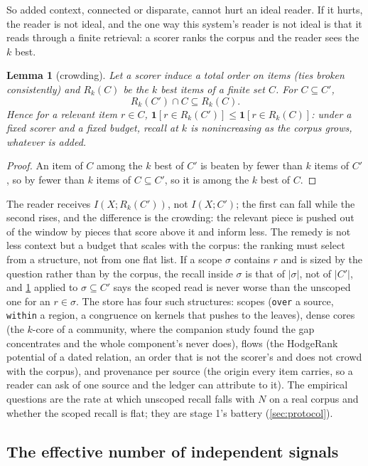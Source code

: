 \documentclass[11pt]{article}
\theoremstyle{plain}
\newtheorem{lemma}[theorem]{Lemma}
\theoremstyle{definition}
\theoremstyle{remark}
\newcommand{\code}[1]{\texttt{#1}}
\begin{document}
So added context, connected or disparate, cannot hurt an ideal reader. If it hurts, the reader is
not ideal, and the one way this system's reader is not ideal is that it reads through a finite
retrieval: a scorer ranks the corpus and the reader sees the $k$ best.

\begin{lemma}[crowding]\label{lem:crowding}
Let a scorer induce a total order on items (ties broken consistently) and $R_k(C)$ be the $k$
best items of a finite set $C$. For $C\subseteq C'$,
\[
  R_k(C')\cap C \subseteq R_k(C).
\]
Hence for a relevant item $r\in C$, $\mathbf 1[r\in R_k(C')] \le \mathbf 1[r\in R_k(C)]$: under a
fixed scorer and a fixed budget, recall at $k$ is nonincreasing as the corpus grows, whatever is
added.
\end{lemma}
\begin{proof}
An item of $C$ among the $k$ best of $C'$ is beaten by fewer than $k$ items of $C'$, so by fewer than
$k$ items of $C\subseteq C'$, so it is among the $k$ best of $C$.
\end{proof}

The reader receives $I(X;R_k(C'))$, not $I(X;C')$; the first can fall while the second rises, and
the difference is the crowding: the relevant piece is pushed out of the window by pieces that score
above it and inform less. The remedy is not less context but a budget that scales with the corpus:
the ranking must select from a structure, not from one flat list. If a scope $\sigma$ contains $r$
and is sized by the question rather than by the corpus, the recall inside $\sigma$ is that of
$|\sigma|$, not of $|C'|$, and \cref{lem:crowding} applied to $\sigma\subseteq C'$ says the scoped
read is never worse than the unscoped one for an $r\in\sigma$. The store has four such structures:
scopes (\code{over} a source, \code{within} a region, a congruence on kernels that pushes to the
leaves), dense cores (the $k$-core of a community, where the companion study found the gap
concentrates and the whole component's never does), flows (the HodgeRank potential of a dated
relation, an order that is not the scorer's and does not crowd with the corpus), and provenance per
source (the origin every item carries, so a reader can ask of one source and the ledger can
attribute to it). The empirical questions are the rate at which unscoped recall falls with $N$ on a
real corpus and whether the scoped recall is flat; they are stage 1's battery (\cref{sec:protocol}).

\subsection{The effective number of independent signals}\label{sec:effective}
\end{document}
